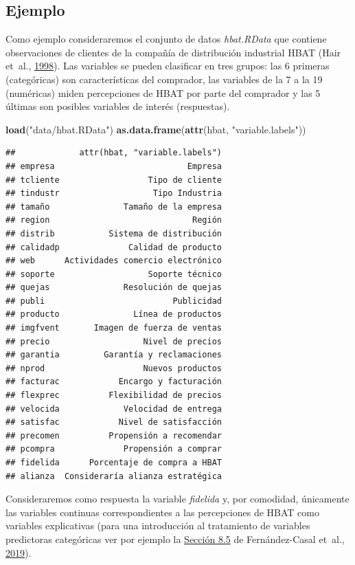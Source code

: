 \documentclass[
  spanish,
]{book}
\newenvironment{Shaded}{\begin{snugshade}}{\end{snugshade}}
\newcommand{\KeywordTok}[1]{\textcolor[rgb]{0.13,0.29,0.53}{\textbf{#1}}}
\newcommand{\NormalTok}[1]{#1}
\newcommand{\StringTok}[1]{\textcolor[rgb]{0.31,0.60,0.02}{#1}}
\theoremstyle{break}
\theoremstyle{definition}
\theoremstyle{definition}
\theoremstyle{definition}
\theoremstyle{remark}
\begin{document}
\hypertarget{ejemplo-2}{%
\subsection{Ejemplo}\label{ejemplo-2}}

Como ejemplo consideraremos el conjunto de datos \emph{hbat.RData} que contiene observaciones de clientes de la compañía de distribución industrial HBAT (Hair et~al., \protect\hyperlink{ref-hair1998multivariate}{1998}).
Las variables se pueden clasificar en tres grupos: las 6 primeras (categóricas) son características del comprador, las variables de la 7 a la 19 (numéricas) miden percepciones de HBAT por parte del comprador y las 5 últimas son posibles variables de interés (respuestas).

\begin{Shaded}
\begin{Highlighting}[]
\KeywordTok{load}\NormalTok{(}\StringTok{"data/hbat.RData"}\NormalTok{)}
\KeywordTok{as.data.frame}\NormalTok{(}\KeywordTok{attr}\NormalTok{(hbat, }\StringTok{"variable.labels"}\NormalTok{))}
\end{Highlighting}
\end{Shaded}

\begin{verbatim}
##             attr(hbat, "variable.labels")
## empresa                           Empresa
## tcliente                  Tipo de cliente
## tindustr                   Tipo Industria
## tamaño               Tamaño de la empresa
## region                             Región
## distrib           Sistema de distribución
## calidadp              Calidad de producto
## web      Actividades comercio electrónico
## soporte                   Soporte técnico
## quejas               Resolución de quejas
## publi                          Publicidad
## producto               Línea de productos
## imgfvent       Imagen de fuerza de ventas
## precio                   Nivel de precios
## garantia         Garantía y reclamaciones
## nprod                    Nuevos productos
## facturac            Encargo y facturación
## flexprec          Flexibilidad de precios
## velocida             Velocidad de entrega
## satisfac            Nivel de satisfacción
## precomen          Propensión a recomendar
## pcompra              Propensión a comprar
## fidelida      Porcentaje de compra a HBAT
## alianza  Consideraría alianza estratégica
\end{verbatim}

Consideraremos como respuesta la variable \emph{fidelida} y, por comodidad, únicamente las variables continuas correspondientes a las percepciones de HBAT como variables explicativas (para una introducción al tratamiento de variables predictoras categóricas ver por ejemplo la \href{https://rubenfcasal.github.io/intror/modelos-lineales.html\#regresion-con-variables-categoricas}{Sección 8.5} de Fernández-Casal et~al., \protect\hyperlink{ref-fernandez2019intror}{2019}).
\end{document}
